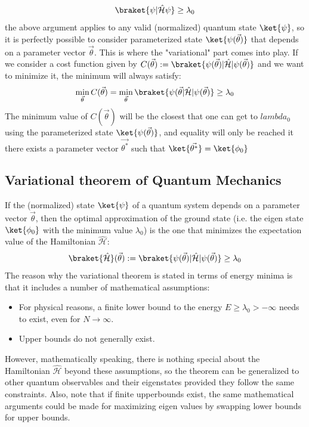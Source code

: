\documentclass[12pt, oneside]{book}
\theoremstyle{definition}
\theoremstyle{definition}
\theoremstyle{remark}
\begin{document}
\[
\braket{\psi|\hat{\mathcal{H}}\psi}\geq \lambda_0
\]
the above argument applies to any valid (normalized) quantum state $\ket{\psi}$, so it is perfectly possible to consider parameterized state $\ket{\psi(\vec{\theta})}$ that depends on a parameter vector $\vec{\theta}$. This is where the "variational" part comes into play. If we consider a cost function given by $C(\vec{\theta}):=\braket{\psi(\vec{\theta})|\hat{\mathcal{H}}|\psi(\vec{\theta})}$ and we want to minimize it, the minimum will always satisfy:
\[
\min_{\vec{\theta}}C(\vec{\theta}) = \min_{\vec{\theta}} \braket{\psi(\vec{\theta}|\hat{\mathcal{H}}|\psi(\vec{\theta})}\geq \lambda_0
\]
The minimum value of $C(\vec{\theta})$ will be the closest that one can get to $lambda_0$ using the parameterized state $\ket{\psi(\vec{\theta})}$, and equality will only be reached it there exists a parameter vector $\vec{\theta^*}$ such that $\ket{\vec{\theta^*}}=\ket{\phi_0}$

\subsection{Variational theorem of Quantum Mechanics}
If the (normalized) state $\ket{\psi}$ of a quantum system depends on a parameter vector $\vec{\theta}$, then the optimal approximation of the ground state (i.e. the eigen state $\ket{\phi_0}$ with the minimum value $\lambda_0$) is the one that minimizes the expectation value of the Hamiltonian $\hat{\mathcal{H}}$:
\[
\braket{\hat{\mathcal{H}}}(\vec{\theta}):=\braket{\psi(\vec{\theta})|\hat{\mathcal{H}}|\psi(\vec{\theta})} \geq \lambda_0
\]
The reason why the variational theorem is stated in terms of energy minima is that it includes a number of mathematical assumptions:
\begin{itemize}
    \item For physical reasons, a finite lower bound to the energy $E\geq \lambda_0>-\infty$ needs to exist, even for $N\rightarrow \infty$.
    \item Upper bounds do not generally exist.
\end{itemize}
However, mathematically speaking, there is nothing special about the Hamiltonian $\hat{\mathcal{H}}$ beyond these assumptions, so the theorem can be generalized to other quantum observables and their eigenstates provided they follow the same constraints. Also, note that if finite upperbounds exist, the same mathematical arguments could be made for maximizing eigen values by swapping lower bounds for upper bounds.
\end{document}
